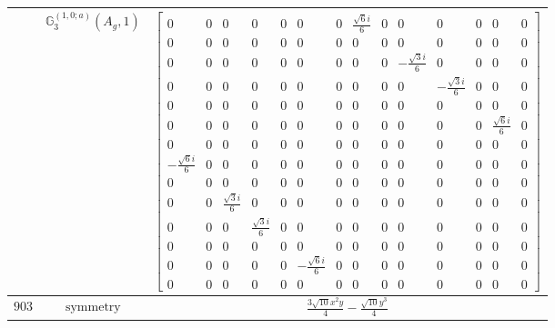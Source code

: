 \documentclass[fleqn,8pt,landscape]{jsarticle}
\begin{document}
\begin{longtable}{ccc}
$  $ & $ \mathbb{G}_{3}^{(1,0;a)}(A_{g},1) $ & $ \begin{bmatrix} 0 & 0 & 0 & 0 & 0 & 0 & 0 & \frac{\sqrt{6} i}{6} & 0 & 0 & 0 & 0 & 0 & 0 \\ 0 & 0 & 0 & 0 & 0 & 0 & 0 & 0 & 0 & 0 & 0 & 0 & 0 & 0 \\ 0 & 0 & 0 & 0 & 0 & 0 & 0 & 0 & 0 & - \frac{\sqrt{3} i}{6} & 0 & 0 & 0 & 0 \\ 0 & 0 & 0 & 0 & 0 & 0 & 0 & 0 & 0 & 0 & - \frac{\sqrt{3} i}{6} & 0 & 0 & 0 \\ 0 & 0 & 0 & 0 & 0 & 0 & 0 & 0 & 0 & 0 & 0 & 0 & 0 & 0 \\ 0 & 0 & 0 & 0 & 0 & 0 & 0 & 0 & 0 & 0 & 0 & 0 & \frac{\sqrt{6} i}{6} & 0 \\ 0 & 0 & 0 & 0 & 0 & 0 & 0 & 0 & 0 & 0 & 0 & 0 & 0 & 0 \\ - \frac{\sqrt{6} i}{6} & 0 & 0 & 0 & 0 & 0 & 0 & 0 & 0 & 0 & 0 & 0 & 0 & 0 \\ 0 & 0 & 0 & 0 & 0 & 0 & 0 & 0 & 0 & 0 & 0 & 0 & 0 & 0 \\ 0 & 0 & \frac{\sqrt{3} i}{6} & 0 & 0 & 0 & 0 & 0 & 0 & 0 & 0 & 0 & 0 & 0 \\ 0 & 0 & 0 & \frac{\sqrt{3} i}{6} & 0 & 0 & 0 & 0 & 0 & 0 & 0 & 0 & 0 & 0 \\ 0 & 0 & 0 & 0 & 0 & 0 & 0 & 0 & 0 & 0 & 0 & 0 & 0 & 0 \\ 0 & 0 & 0 & 0 & 0 & - \frac{\sqrt{6} i}{6} & 0 & 0 & 0 & 0 & 0 & 0 & 0 & 0 \\ 0 & 0 & 0 & 0 & 0 & 0 & 0 & 0 & 0 & 0 & 0 & 0 & 0 & 0 \end{bmatrix} $ \\ \hline
$ 903 $ & $ \text{symmetry} $ & $ \frac{3 \sqrt{10} x^{2} y}{4} - \frac{\sqrt{10} y^{3}}{4} $ \\

\end{longtable}
\end{document}
